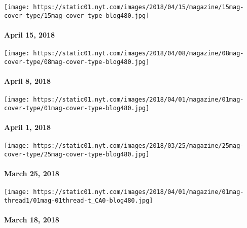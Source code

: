 \href{https://www.nytimes.com/issue/magazine/2018/04/12/41518-issue}{}

\texttt{[image: https://static01.nyt.com/images/2018/04/15/magazine/15mag-cover-type/15mag-cover-type-blog480.jpg]}

\hypertarget{april-15-2018}{%
\paragraph{April 15, 2018}\label{april-15-2018}}

\href{https://www.nytimes.com/issue/magazine/2018/04/12/4818-issue}{}

\texttt{[image: https://static01.nyt.com/images/2018/04/08/magazine/08mag-cover-type/08mag-cover-type-blog480.jpg]}

\hypertarget{april-8-2018}{%
\paragraph{April 8, 2018}\label{april-8-2018}}

\href{https://www.nytimes.com/issue/magazine/2018/03/30/4118-issue}{}

\texttt{[image: https://static01.nyt.com/images/2018/04/01/magazine/01mag-cover-type/01mag-cover-type-blog480.jpg]}

\hypertarget{april-1-2018}{%
\paragraph{April 1, 2018}\label{april-1-2018}}

\href{https://www.nytimes.com/issue/magazine/2018/03/30/32518-issue}{}

\texttt{[image: https://static01.nyt.com/images/2018/03/25/magazine/25mag-cover-type/25mag-cover-type-blog480.jpg]}

\hypertarget{march-25-2018}{%
\paragraph{March 25, 2018}\label{march-25-2018}}

\href{https://www.nytimes.com/issue/magazine/2018/03/30/31818-issue}{}

\texttt{[image: https://static01.nyt.com/images/2018/04/01/magazine/01mag-thread1/01mag-01thread-t\_CA0-blog480.jpg]}

\hypertarget{march-18-2018}{%
\paragraph{March 18, 2018}\label{march-18-2018}}

